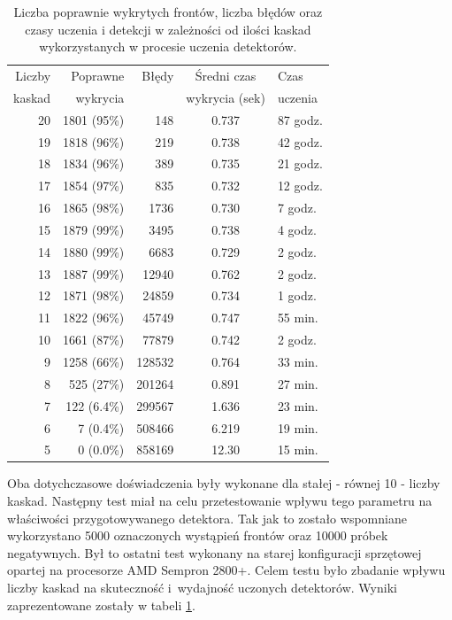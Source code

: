 \begin{table}[!h]
	\centering                                                          
	\caption{Liczba poprawnie wykrytych frontów, liczba błędów oraz czasy uczenia 
		i detekcji w zależności od ilości kaskad wykorzystanych w procesie uczenia 
		detektorów.}
	\begin{tabular}{r|r|r|c|l}
		Liczby    & Poprawne     & Błędy  & Średni czas    & Czas     \\
		kaskad    & wykrycia     &        & wykrycia (sek) & uczenia  \\
		\hline
		20        & 1801 (95\%)  & 148    & 0.737   & 87 godz.\\
		19        & 1818 (96\%)  & 219    & 0.738   & 42 godz.\\
		18        & 1834 (96\%)  & 389    & 0.735   & 21 godz.\\
		17        & 1854 (97\%)  & 835    & 0.732   & 12 godz.\\
		16        & 1865 (98\%)  & 1736   & 0.730   & 7 godz. \\
		15        & 1879 (99\%)  & 3495   & 0.738   & 4 godz. \\
		14        & 1880 (99\%)  & 6683   & 0.729   & 2 godz. \\
		13        & 1887 (99\%)  & 12940  & 0.762   & 2 godz. \\
		12        & 1871 (98\%)  & 24859  & 0.734   & 1 godz. \\
		11        & 1822 (96\%)  & 45749  & 0.747   & 55 min. \\
		10        & 1661 (87\%)  & 77879  & 0.742   & 2 godz. \\
		9         & 1258 (66\%)  & 128532 & 0.764   & 33 min. \\
		8         & 525  (27\%)  & 201264 & 0.891   & 27 min. \\
		7         & 122  (6.4\%) & 299567 & 1.636   & 23 min. \\
		6         & 7    (0.4\%) & 508466 & 6.219   & 19 min. \\
		5         & 0    (0.0\%) & 858169 & 12.30   & 15 min. \\
	\end{tabular} 
	\label{tab:cascade_2_effi}
\end{table}

Oba dotychczasowe doświadczenia były wykonane dla stałej - równej 10 - liczby kaskad.
Następny test miał na celu przetestowanie wpływu tego parametru na właściwości
przygotowywanego detektora. Tak jak to zostało wspomniane wykorzystano 5000 oznaczonych 
wystąpień frontów oraz
10000 próbek negatywnych. Był to ostatni test wykonany na starej konfiguracji sprzętowej
opartej na procesorze AMD Sempron 2800+. Celem testu było zbadanie wpływu liczby kaskad
na skuteczność i~wydajność uczonych detektorów. Wyniki zaprezentowane zostały w tabeli 
\ref{tab:cascade_2_effi}.


